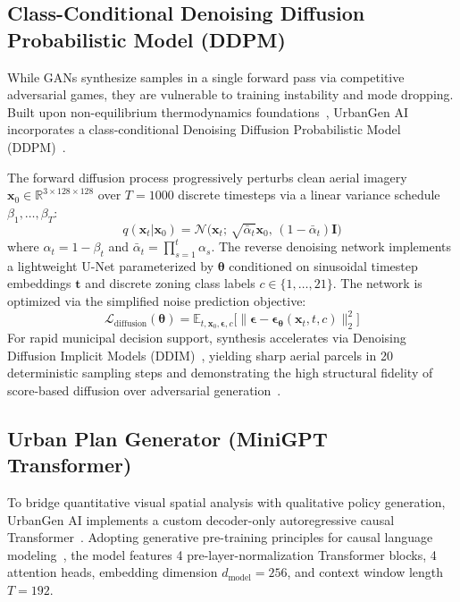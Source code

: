 \documentclass[conference]{IEEEtran}
\begin{document}
\subsection{Class-Conditional Denoising Diffusion Probabilistic Model (DDPM)}
While GANs synthesize samples in a single forward pass via competitive adversarial games, they are vulnerable to training instability and mode dropping. Built upon non-equilibrium thermodynamics foundations~\cite{sohl2015deep}, UrbanGen AI incorporates a class-conditional Denoising Diffusion Probabilistic Model (DDPM)~\cite{ho2020denoising}.

The forward diffusion process progressively perturbs clean aerial imagery $\mathbf{x}_0 \in \mathbb{R}^{3 \times 128 \times 128}$ over $T=1000$ discrete timesteps via a linear variance schedule $\beta_1, \dots, \beta_T$:
\begin{equation}
q(\mathbf{x}_t | \mathbf{x}_0) = \mathcal{N}\Big(\mathbf{x}_t;\, \sqrt{\bar{\alpha}_t} \mathbf{x}_0,\, (1 - \bar{\alpha}_t)\mathbf{I}\Big)
\end{equation}
where $\alpha_t = 1 - \beta_t$ and $\bar{\alpha}_t = \prod_{s=1}^t \alpha_s$. The reverse denoising network implements a lightweight U-Net parameterized by $\boldsymbol{\theta}$ conditioned on sinusoidal timestep embeddings $\mathbf{t}$ and discrete zoning class labels $c \in \{1, \dots, 21\}$. The network is optimized via the simplified noise prediction objective:
\begin{equation}
\mathcal{L}_{\text{diffusion}}(\boldsymbol{\theta}) = \mathbb{E}_{t, \mathbf{x}_0, \boldsymbol{\epsilon}, c}\Big[\big\|\boldsymbol{\epsilon} - \boldsymbol{\epsilon}_{\boldsymbol{\theta}}(\mathbf{x}_t, t, c)\big\|_2^2\Big]
\end{equation}
For rapid municipal decision support, synthesis accelerates via Denoising Diffusion Implicit Models (DDIM)~\cite{song2020denoising}, yielding sharp aerial parcels in 20 deterministic sampling steps and demonstrating the high structural fidelity of score-based diffusion over adversarial generation~\cite{dhariwal2021diffusion}.

\subsection{Urban Plan Generator (MiniGPT Transformer)}
To bridge quantitative visual spatial analysis with qualitative policy generation, UrbanGen AI implements a custom decoder-only autoregressive causal Transformer~\cite{vaswani2017attention}. Adopting generative pre-training principles for causal language modeling~\cite{radford2019language}, the model features 4 pre-layer-normalization Transformer blocks, 4 attention heads, embedding dimension $d_{\text{model}} = 256$, and context window length $T=192$.
\end{document}
